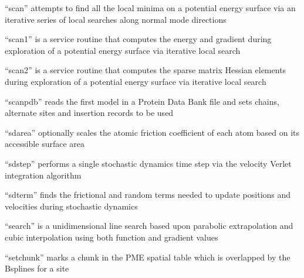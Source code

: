 \documentclass[letterpaper,11pt,english]{sphinxmanual}
\begin{document}
“scan” attempts to find all the local minima on a potential
energy surface via an iterative series of local searches along
normal mode directions


“scan1” is a service routine that computes the energy and
gradient during exploration of a potential energy surface
via iterative local search


“scan2” is a service routine that computes the sparse matrix
Hessian elements during exploration of a potential energy
surface via iterative local search


“scanpdb” reads the first model in a Protein Data Bank file and
sets chains, alternate sites and insertion records to be used


“sdarea” optionally scales the atomic friction coefficient
of each atom based on its accessible surface area


“sdstep” performs a single stochastic dynamics time step
via the velocity Verlet integration algorithm


“sdterm” finds the frictional and random terms needed to
update positions and velocities during stochastic dynamics


“search” is a unidimensional line search based upon parabolic
extrapolation and cubic interpolation using both function and
gradient values






“setchunk” marks a chunk in the PME spatial table which is
overlapped by the B\sphinxhyphen{}splines for a site


\end{document}

